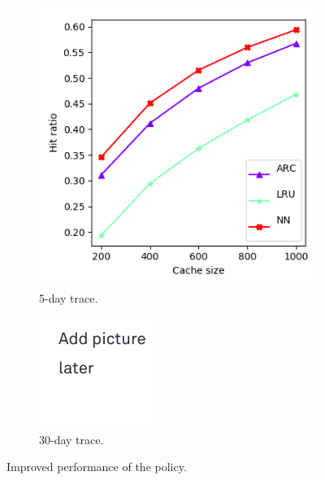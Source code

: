 \begin{figure}[h!]
	\centering
	\begin{subfigure}[b]{0.49\linewidth}
		\includegraphics[width=\linewidth]{pics/cache4.png}
		\caption{5-day trace.}
	\end{subfigure}
	\begin{subfigure}[b]{0.49\linewidth}
		\includegraphics[width=\linewidth]{pics/todo.png}
		\caption{30-day trace.}
	\end{subfigure}
	\caption{Improved performance of the policy.}
	\label{fig:cache4}
\end{figure}

